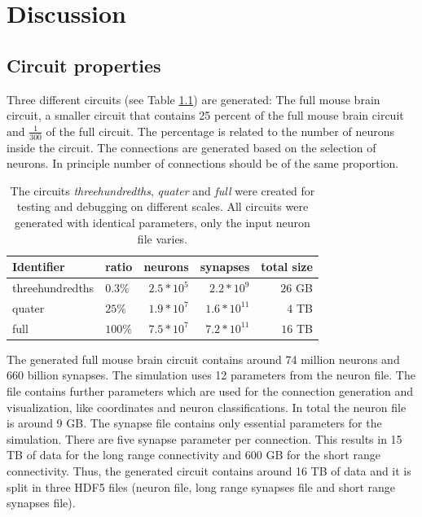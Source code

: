 %

\chapter{Discussion}

\section{Circuit properties}

Three different circuits (see Table \ref{table:circuits}) are generated: The full mouse brain circuit,
a smaller circuit that contains 25 percent of the full mouse brain circuit and
$\frac{1}{300}$ of the full circuit. The percentage is related to the number of neurons inside
the circuit. The connections are generated based on the selection of neurons. In principle
number of connections should be of the same proportion.

\begin{table}[ht!]
\begin{centering}
    \begin{tabular}{ | l | l | r | r | r |}
    \hline
    Identifier & ratio & neurons & synapses & total size \\ \hline \hline
    threehundredths & $0.3\%$ & $~2.5*10^5$ & $~2.2*10^9$ & $~26$ GB \\ \hline
    quater & $25\%$ & $~1.9*10^7$ & $~1.6*10^{11}$ & $~4$ TB \\ \hline
    full & $100\%$ & $~7.5*10^7$ & $~7.2*10^{11}$ & $~16$ TB \\ \hline
    \end{tabular}
    \caption{The circuits \emph{threehundredths}, \emph{quater} and \emph{full} were created for testing and debugging on different scales.
All circuits were generated with identical parameters, only the input neuron file varies.}
\end{centering}
\label{table:circuits}
    \end{table}

The generated full mouse brain circuit contains around 74 million neurons and 660 billion synapses.
The simulation uses 12 parameters from the neuron file.
The file contains further parameters which are used for the connection generation and visualization,
like coordinates and neuron classifications. In total the neuron file is around 9 GB.
The synapse file contains only essential parameters for the simulation.
There are five synapse parameter per connection. This results in 15 TB of data
for the long range connectivity and 600 GB for the short range connectivity.
Thus, the generated circuit contains around 16 TB of data and it is split in three HDF5
files (neuron file, long range synapses file and short range synapses file).

